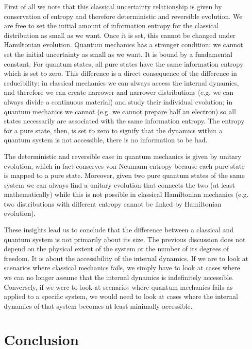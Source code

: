 \documentclass{ws-ijqi}
\begin{document}
First of all we note that this classical uncertainty relationship is given by conservation of entropy and therefore deterministic and reversible evolution. We are free to set the initial amount of information entropy for the classical distribution as small as we want. Once it is set, this cannot be changed under Hamiltonian evolution. Quantum mechanics has a stronger condition: we cannot set the initial uncertainty as small as we want. It is bound by a fundamental constant. For quantum states, all pure states have the same information entropy which is set to zero. This difference is a direct consequence of the difference in reducibility: in classical mechanics we can always access the internal dynamics, and therefore we can create narrower and narrower distributions (e.g. we can always divide a continuous material) and study their individual evolution; in quantum mechanics we cannot (e.g. we cannot prepare half an electron) so all states necessarily are associated with the same information entropy. The entropy for a pure state, then, is set to zero to signify that the dynamics within a quantum system is not accessible, there is no information to be had.

The deterministic and reversible case in quantum mechanics is given by unitary evolution, which in fact conserves von Neumann entropy because each pure state is mapped to a pure state. Moreover, given two pure quantum states of the same system we can always find a unitary evolution that connects the two (at least mathematically) while this is not possible in classical Hamiltonian mechanics (e.g. two distributions with different entropy cannot be linked by Hamiltonian evolution).

These insights lead us to conclude that the difference between a classical and quantum system is not primarily about its size. The previous discussion does not depend on the physical extent of the system or the number of its degrees of freedom. It is about the accessibility of the internal dynamics. If we are to look at scenarios where classical mechanics fails, we simply have to look at cases where we can no longer assume that the internal dynamics is indefinitely accessible. Conversely, if we were to look at scenarios where quantum mechanics fails as applied to a specific system, we would need to look at cases where the internal dynamics of that system becomes at least minimally accessible.

\section{Conclusion}
\end{document}
